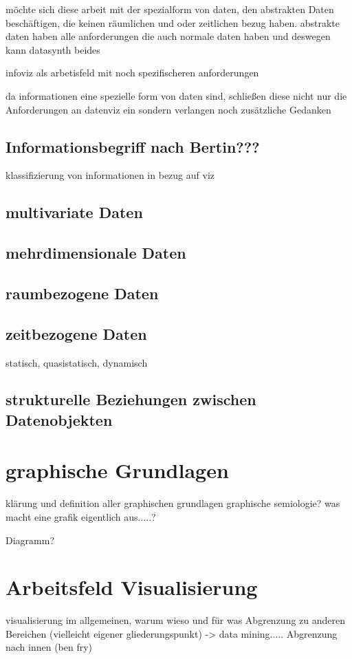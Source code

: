 \documentclass[a4paper, 12pt, onepage, pdftex, headsepline, footsepline]{scrreprt}
\begin{document}
möchte sich diese arbeit mit der spezialform von daten, den abstrakten Daten beschäftigen, die keinen räumlichen und oder zeitlichen bezug haben.
abstrakte daten haben alle anforderungen die auch normale daten haben und deswegen kann datasynth beides

infoviz als arbetisfeld mit noch spezifischeren anforderungen

da informationen eine spezielle form von daten sind, schließen diese nicht nur die Anforderungen an datenviz ein sondern verlangen noch zusätzliche Gedanken

\subsection{Informationsbegriff nach Bertin???}

klassifizierung von informationen in bezug auf viz

\subsection{multivariate Daten}
\subsection{mehrdimensionale Daten}
\subsection{raumbezogene Daten}
\subsection{zeitbezogene Daten}
statisch, quasistatisch, dynamisch
\subsection{strukturelle Beziehungen zwischen Datenobjekten}

\section{graphische Grundlagen}

klärung und definition aller graphischen grundlagen
graphische semiologie?
was macht eine grafik eigentlich aus.....?

Diagramm?

\section{Arbeitsfeld Visualisierung}
visualisierung im allgemeinen, warum wieso und für was
Abgrenzung zu anderen Bereichen (vielleicht eigener gliederungspunkt) -> data mining.....
Abgrenzung nach innen (ben fry)
\end{document}
